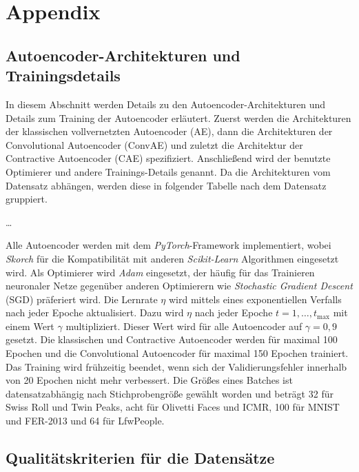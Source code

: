 
\chapter{Appendix}
\label{ch:Appendix}

\section{Autoencoder-Architekturen und Trainingsdetails}
\label{ch:Appendix:Architektur-Details}
In diesem Abschnitt werden Details zu den Autoencoder-Architekturen und Details zum Training der Autoencoder erläutert. Zuerst werden die Architekturen der klassischen vollvernetzten Autoencoder (AE), dann die Architekturen der Convolutional Autoencoder (ConvAE) und zuletzt die Architektur der Contractive Autoencoder (CAE) spezifiziert. Anschließend wird der benutzte Optimierer und andere Trainings-Details genannt. Da die Architekturen
vom Datensatz abhängen, werden diese in folgender Tabelle nach dem Datensatz gruppiert.

\ldots

Alle Autoencoder werden mit dem \textit{PyTorch}-Framework implementiert, wobei \textit{Skorch} für
die Kompatibilität mit anderen \textit{Scikit-Learn} Algorithmen eingesetzt wird. Als Optimierer
wird \textit{Adam} eingesetzt, der häufig für das Trainieren neuronaler Netze gegenüber anderen
Optimierern wie \textit{Stochastic Gradient Descent} (SGD) präferiert wird. Die Lernrate $\eta$
wird mittels eines exponentiellen Verfalls nach jeder Epoche aktualisiert. Dazu wird $\eta$ nach
jeder Epoche $t = 1, \ldots, t_{\text{max}}$ mit einem Wert $\gamma$ multipliziert. Dieser Wert
wird für alle Autoencoder auf $\gamma = 0,9$ gesetzt. Die klassischen und Contractive Autoencoder
werden für maximal 100 Epochen und die Convolutional Autoencoder für maximal 150 Epochen trainiert.
Das Training wird frühzeitig beendet, wenn sich der Validierungsfehler innerhalb von 20 Epochen
nicht mehr verbessert. Die Größes eines Batches ist datensatzabhängig nach Stichprobengröße gewählt
worden und beträgt 32 für Swiss Roll und Twin Peaks, acht für Olivetti Faces und ICMR, 100 für
MNIST und FER-2013 und 64 für LfwPeople.

\section{Qualitätskriterien für die Datensätze}
\label{ch:Appendix:Qualitaetskriterien}

